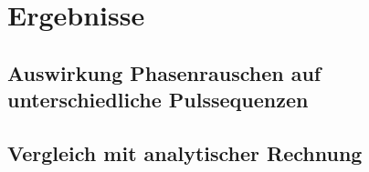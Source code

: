 \chapter{Ergebnisse}

\section{Auswirkung Phasenrauschen auf unterschiedliche Pulssequenzen}

\section{Vergleich mit analytischer Rechnung}
